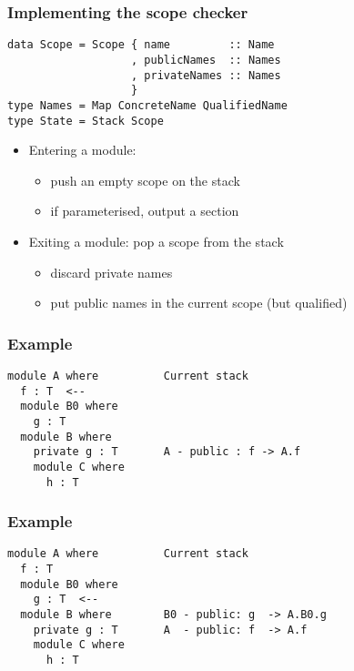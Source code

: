 \documentclass{beamer}
\newenvironment{agda}{
\begin{block}{}\small
}{
\end{block}
}
\begin{document}
\begin{frame}[fragile]
  \frametitle{Implementing the scope checker}
\begin{agda}
\begin{verbatim}
data Scope = Scope { name         :: Name
                   , publicNames  :: Names
                   , privateNames :: Names
                   }
type Names = Map ConcreteName QualifiedName
type State = Stack Scope
\end{verbatim}
\end{agda}
\begin{itemize}
  \item Entering a module:
  \begin{itemize}
    \item push an empty scope on the stack
    \item if parameterised, output a section
  \end{itemize}
  \item Exiting a module: pop a scope from the stack
  \begin{itemize}
    \item discard private names
    \item put public names in the current scope (but qualified)
  \end{itemize}
\end{itemize}

\end{frame}

\begin{frame}[fragile]
  \frametitle{Example}
\begin{agda}
\begin{verbatim}
module A where          Current stack
  f : T  <-- 
  module B0 where
    g : T
  module B where     
    private g : T       A - public : f -> A.f
    module C where                   
      h : T

\end{verbatim}
\end{agda}
\end{frame}

\begin{frame}[fragile]
  \frametitle{Example}
\begin{agda}
\begin{verbatim}
module A where          Current stack
  f : T
  module B0 where
    g : T  <--
  module B where        B0 - public: g  -> A.B0.g
    private g : T       A  - public: f  -> A.f
    module C where                   
      h : T

\end{verbatim}
\end{agda}
\end{frame}
\end{document}
